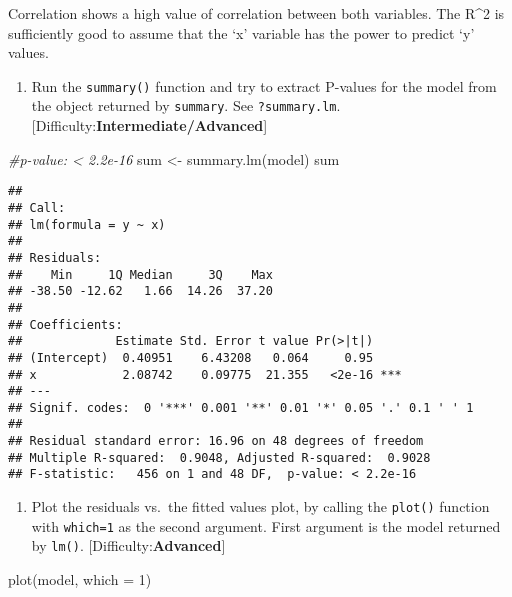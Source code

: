 \documentclass[
]{article}
\newenvironment{Shaded}{\begin{snugshade}}{\end{snugshade}}
\newcommand{\AttributeTok}[1]{\textcolor[rgb]{0.77,0.63,0.00}{#1}}
\newcommand{\CommentTok}[1]{\textcolor[rgb]{0.56,0.35,0.01}{\textit{#1}}}
\newcommand{\DecValTok}[1]{\textcolor[rgb]{0.00,0.00,0.81}{#1}}
\newcommand{\FunctionTok}[1]{\textcolor[rgb]{0.00,0.00,0.00}{#1}}
\newcommand{\NormalTok}[1]{#1}
\newcommand{\OtherTok}[1]{\textcolor[rgb]{0.56,0.35,0.01}{#1}}
\providecommand{\tightlist}{%
  \setlength{\itemsep}{0pt}\setlength{\parskip}{0pt}}
\begin{document}
Correlation shows a high value of correlation between both variables.
The R\^{}2 is sufficiently good to assume that the `x' variable has the
power to predict `y' values.

\begin{enumerate}
\def\labelenumi{\arabic{enumi}.}
\setcounter{enumi}{3}
\tightlist
\item
  Run the \texttt{summary()} function and try to extract P-values for
  the model from the object returned by \texttt{summary}. See
  \texttt{?summary.lm}. {[}Difficulty:\textbf{Intermediate/Advanced}{]}
\end{enumerate}

\begin{Shaded}
\begin{Highlighting}[]
\CommentTok{\#p{-}value: \textless{} 2.2e{-}16}
\NormalTok{sum }\OtherTok{\textless{}{-}} \FunctionTok{summary.lm}\NormalTok{(model)}
\NormalTok{sum}
\end{Highlighting}
\end{Shaded}

\begin{verbatim}
## 
## Call:
## lm(formula = y ~ x)
## 
## Residuals:
##    Min     1Q Median     3Q    Max 
## -38.50 -12.62   1.66  14.26  37.20 
## 
## Coefficients:
##             Estimate Std. Error t value Pr(>|t|)    
## (Intercept)  0.40951    6.43208   0.064     0.95    
## x            2.08742    0.09775  21.355   <2e-16 ***
## ---
## Signif. codes:  0 '***' 0.001 '**' 0.01 '*' 0.05 '.' 0.1 ' ' 1
## 
## Residual standard error: 16.96 on 48 degrees of freedom
## Multiple R-squared:  0.9048, Adjusted R-squared:  0.9028 
## F-statistic:   456 on 1 and 48 DF,  p-value: < 2.2e-16
\end{verbatim}

\begin{enumerate}
\def\labelenumi{\arabic{enumi}.}
\setcounter{enumi}{4}
\tightlist
\item
  Plot the residuals vs.~the fitted values plot, by calling the
  \texttt{plot()} function with \texttt{which=1} as the second argument.
  First argument is the model returned by \texttt{lm()}.
  {[}Difficulty:\textbf{Advanced}{]}
\end{enumerate}

\begin{Shaded}
\begin{Highlighting}[]
\FunctionTok{plot}\NormalTok{(model, }\AttributeTok{which =} \DecValTok{1}\NormalTok{)}
\end{Highlighting}
\end{Shaded}
\end{document}

